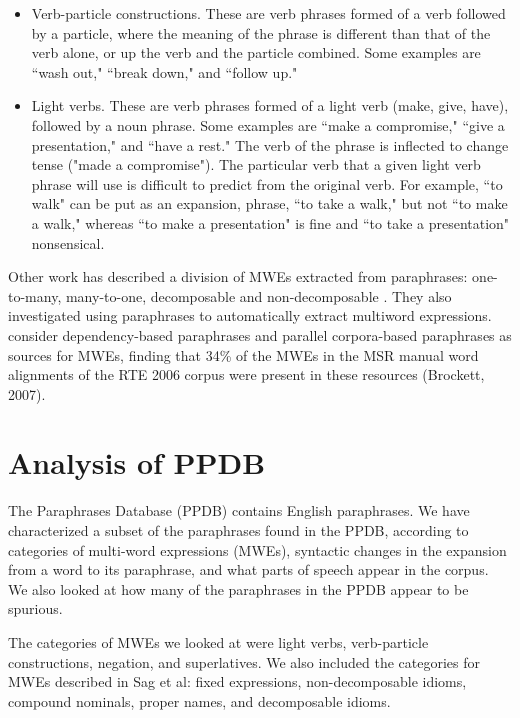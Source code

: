 \documentclass[11pt]{article}
\begin{document}
\begin{itemize}
\item Verb-particle constructions. These are verb phrases formed of a verb followed by a particle, where the meaning of the phrase is different than that of the verb alone, or up the verb and the particle combined. Some examples are ``wash out," ``break down," and ``follow up." 

\item Light verbs. These are verb phrases formed of a light verb (make, give, have), followed by a noun phrase. Some examples are ``make a compromise," ``give a presentation," and ``have a rest." The verb of the phrase is inflected to change tense ("made a compromise"). The particular verb that a given light verb phrase will use is difficult to predict from the original verb. For example, ``to walk" can be put as an expansion,  phrase, ``to take a walk," but not ``to make a walk," whereas ``to make a presentation" is fine and ``to take a presentation" nonsensical.
\end{itemize}

Other work has described a division of MWEs extracted from paraphrases: one-to-many, many-to-one,  decomposable and non-decomposable \cite{dpm}. They also investigated using paraphrases to automatically extract multiword expressions. \cite{dpm} consider dependency-based paraphrases and parallel corpora-based paraphrases as sources for MWEs, finding that 34\% of the MWEs in the MSR manual word alignments of the RTE 2006 corpus were present in these resources (Brockett, 2007). 

\section{Analysis of PPDB}\label{analysis}
The Paraphrases Database (PPDB) contains English paraphrases. We have characterized a subset of the paraphrases found in the PPDB, according to categories of multi-word expressions (MWEs), syntactic changes in the expansion from a word to its paraphrase, and what parts of speech appear in the corpus. We also looked at how many of the paraphrases in the PPDB appear to be spurious.

The categories of MWEs we looked at were light verbs, verb-particle constructions, negation, and superlatives. We also included the categories for MWEs described in Sag et al: fixed expressions, non-decomposable idioms, compound nominals, proper names, and decomposable idioms. 
\end{document}
